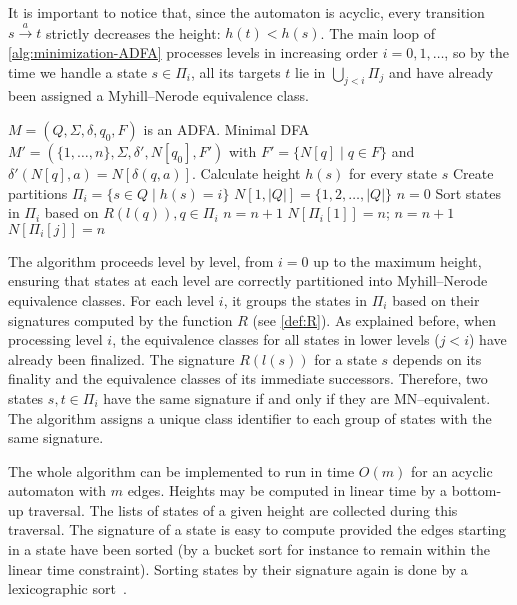 It is important to notice that, since the automaton is acyclic, every transition $s \xrightarrow{a} t$ strictly decreases the height: $h(t) < h(s)$. The main loop of \cref{alg:minimization-ADFA} processes levels in increasing order $i=0,1,\dots$, so by the time we handle a state $s\in\Pi_i$, all its targets $t$ lie in $\bigcup_{j<i}\Pi_j$ and have already been assigned a Myhill--Nerode equivalence class.

\begin{algorithm}[H]
    \caption{$\textsc{RevuzMinimization}(M)$}
    \label{alg:minimization-ADFA}
    \begin{algorithmic}[1]
    \Require $M=(Q,\Sigma,\delta,q_0,F)$ is an ADFA.
    \Ensure Minimal DFA $M'=(\{1,\dots,n\},\Sigma,\delta',N[q_0],F')$ with $F'=\{N[q]\mid q\in F\}$ and $\delta'(N[q],a)=N[\delta(q,a)]$.
    \State Calculate height $h(s)$ for every state $s$
    \State Create partitions $\Pi_i = \{s \in Q \mid h(s) = i\}$
    \State $N[1, |Q|] = \{1,2,\dots,|Q|\}$ 
    \State $n = 0$
     
        \State Sort states in $\Pi_i$ based on $R(l(q)), q\in \Pi_i$
        \State $n = n + 1$
        \State $N[\Pi_i[1]] = n$;
                \State $n = n + 1$
            \EndIf
            \State $N[\Pi_i[j]] = n$
        \EndFor
    \EndFor
    \end{algorithmic}
\end{algorithm}

The algorithm proceeds level by level, from $i=0$ up to the maximum height, ensuring that states at each level are correctly partitioned into Myhill--Nerode equivalence classes. For each level $i$, it groups the states in $\Pi_i$ based on their signatures computed by the function $R$ (see \cref{def:R}). As explained before, when processing level $i$, the equivalence classes for all states in lower levels ($j < i$) have already been finalized. The signature $R(l(s))$ for a state $s$ depends on its finality and the equivalence classes of its immediate successors. Therefore, two states $s, t \in \Pi_i$ have the same signature if and only if they are MN--equivalent. The algorithm assigns a unique class identifier to each group of states with the same signature.

The whole algorithm can be implemented to run in time $O(m)$ for an acyclic automaton with $m$ edges. Heights may be computed in linear time by
a bottom-up traversal. The lists of states of a given height are collected during this traversal. The signature of a state is easy to compute provided the edges starting in a state have
been sorted (by a bucket sort for instance to remain within the linear time constraint).
Sorting states by their signature again is done by a lexicographic sort~\cite{berstel2010minimization}. 

